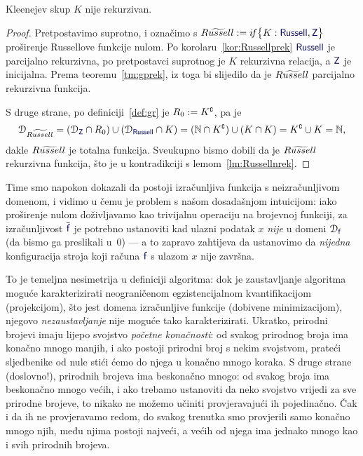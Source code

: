 \begin{teorem}[{name=[nerekurzivnost Kleenejeva skupa]}]\label{tm:DRnrek}
Kleenejev skup $K$ nije rekurzivan.
\end{teorem}
\begin{proof}
Pretpostavimo suprotno, i označimo s $\rus:=\IF{K:\f{Russell},\f Z}$ proširenje Russellove funkcije nulom.
Po korolaru~\ref{kor:Russellprek} $\f{Russell}$ je parcijalno rekurzivna, po pretpostavci suprotnog je $K$ rekurzivna relacija, a $\f Z$ je inicijalna. Prema teoremu~\ref{tm:gprek}, iz toga bi slijedilo da je $\textit{$R\widetilde{usse}ll$}$ parcijalno rekurzivna funkcija.

S druge strane, po definiciji~\ref{def:gr} je $R_0:=K\sp{{\scriptscriptstyle\complement}}$, pa je
\begin{equation}
    \dom{\rus}=(\dom{\f Z}\cap R_0)\cup(\dom{\f{Russell}}\cap K)=(\N\cap K\kompl)\cup(K\cap K)=K\kompl\cup K=\N\text,
\end{equation}
dakle $\textit{$R\widetilde{usse}ll$}$ je totalna funkcija. Sveukupno bismo dobili da je $\textit{$R\widetilde{usse}ll$}$ rekurzivna funkcija, što je u kontradikciji s lemom~\ref{lm:Russellnrek}.%
\end{proof}

Time smo napokon dokazali da postoji izračunljiva funkcija s neizračunljivom domenom, i vidimo u čemu je problem s našom dosadašnjom intuicijom: iako proširenje nulom doživljavamo kao trivijalnu operaciju na brojevnoj funkciji, za izračunljivost $\tilde{\f f}$ je potrebno ustanoviti kad ulazni podatak $x$ \emph{nije} u domeni $\dom{\f f}$ (da bismo ga preslikali u~$0$) --- a to zapravo zahtijeva da ustanovimo da \emph{nijedna} konfiguracija stroja koji računa $\f f$ s ulazom $x$ nije završna.

To je temeljna nesimetrija u definiciji algoritma: dok je zaustavljanje algoritma moguće karakterizirati neograničenom egzistencijalnom kvantifikacijom (projekcijom), što jest domena izračunljive funkcije (dobivene minimizacijom), njegovo \emph{nezaustavljanje} nije moguće tako karakterizirati. Ukratko, prirodni brojevi imaju lijepo svojstvo \emph{početne konačnosti}: od svakog prirodnog broja ima konačno mnogo manjih, i ako postoji prirodni broj s nekim svojstvom, prateći sljedbenike od nule stići ćemo do njega u konačno mnogo koraka. S druge strane (doslovno!), prirodnih brojeva ima beskonačno mnogo: od svakog broja ima beskonačno mnogo većih, i ako trebamo ustanoviti da neko svojstvo vrijedi za sve prirodne brojeve, to nikako ne možemo učiniti provjeravajući ih pojedinačno. Čak i da ih ne provjeravamo redom, do svakog trenutka smo provjerili samo konačno mnogo njih, među njima postoji najveći, a većih od njega ima jednako mnogo kao i svih prirodnih brojeva.

